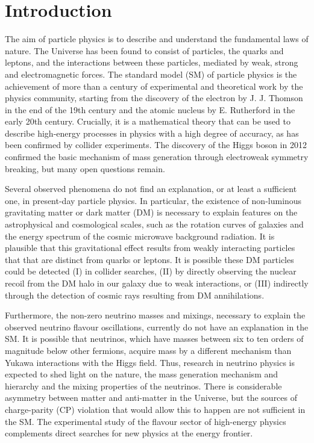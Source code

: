 \chapter*{Introduction}

The aim of particle physics is to describe and understand the fundamental laws of nature. The Universe has been found to consist of particles, the quarks and leptons, and the interactions between these particles, mediated by weak, strong and electromagnetic forces. The standard model (SM) of particle physics is the achievement of more than a century of experimental and theoretical work by the physics community, starting from the discovery of the electron by J. J. Thomson in the end of the 19th century and the atomic nucleus by E. Rutherford in the early 20th century. Crucially, it is a mathematical theory that can be used to describe high-energy processes in physics with a high degree of accuracy, as has been confirmed by collider experiments. The discovery of the Higgs boson in 2012 confirmed the basic mechanism of mass generation through electroweak symmetry breaking, but many open questions remain.

Several observed phenomena do not find an explanation, or at least a sufficient one, in present-day particle physics. In particular, the existence of non-luminous gravitating matter or dark matter (DM) is necessary to explain features on the astrophysical and cosmological scales, such as the rotation curves of galaxies and the energy spectrum of the cosmic microwave background radiation. It is plausible that this gravitational effect results from weakly interacting particles that that are distinct from quarks or leptons. It is possible these DM particles could be detected (I) in collider searches, (II) by directly observing the nuclear recoil from the DM halo in our galaxy due to weak interactions, or (III) indirectly through the detection of cosmic rays resulting from DM annihilations.

Furthermore, the non-zero neutrino masses and mixings, necessary to explain the observed neutrino flavour oscillations, currently do not have an explanation in the SM. It is possible that neutrinos, which have masses between six to ten orders of magnitude below other fermions, acquire mass by a different mechanism than Yukawa interactions with the Higgs field. Thus, research in neutrino physics is expected to shed light on the nature, the mass generation mechanism and hierarchy and the mixing properties of the neutrinos. There is considerable asymmetry between matter and anti-matter in the Universe, but the sources of charge-parity (CP) violation that would allow this to happen are not sufficient in the SM. The experimental study of the flavour sector of high-energy physics complements direct searches for new physics at the energy frontier.

